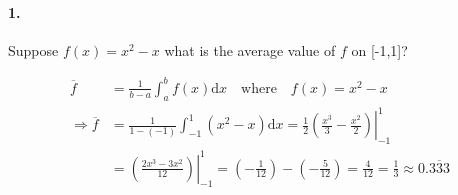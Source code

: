 


\renewcommand\assignment{Homework Set I, Due Monday, January 23rd, 2023}



    \iffalse
    \begin{equation*}
        \begin{gathered}
            Equations go here.
        \end{gathered}
    \end{equation*}

    \resizebox{\hsize}{!}{$Long equation goes here$}

    \begin{multicol*}{# of columns}
    \end{multicol*}

    \horizontal

    \fi


    \paragraph*{1.}
    Suppose $f(x) = x^2-x$ what is the average value of $f$ on [-1,1]?

    \begin{mdframed}
        \begin{align*}
                \overline{f} & = \frac{1}{b-a} \int_{a}^{b}f(x)\mathrm{d}x \quad \text{where} \quad f(x) = x^2-x   \\
                \Rightarrow\overline{f} & = \frac{1}{1-(-1)} \int_{-1}^{1}(x^2-x)\mathrm{d}x = \frac{1}{2}\left.\left(\frac{x^3}{3}-\frac{x^2}{2}\right)\right|_{-1}^{1}   \\
                & = \left.\left(\frac{2x^3-3x^2}{12}\right)\right|_{-1}^{1} = \left(-\frac{1}{12}\right) - \left(-\frac{5}{12}\right) = \frac{4}{12} = \boxed{\frac{1}{3} \approx 0.\overline{333}}
        \end{align*}
    \end{mdframed}

